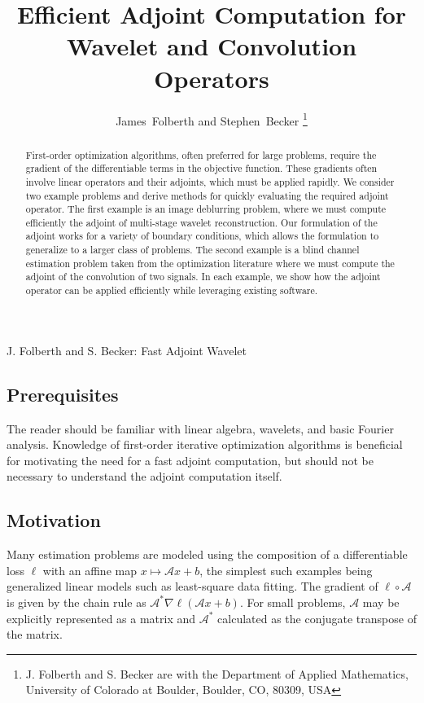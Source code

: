 \documentclass[journal]{IEEEtran}
\newcommand{\A}{\mathcal{A}}
\begin{document}
\title{Efficient Adjoint Computation for Wavelet and Convolution Operators}
\author{James~Folberth and 
        Stephen~Becker%
\thanks{J. Folberth and S. Becker are with the Department
of Applied Mathematics, University of Colorado at Boulder,
Boulder, CO, 80309, USA}}

%
{J. Folberth and S. Becker: Fast Adjoint Wavelet}

\maketitle

\begin{abstract}
   First-order optimization algorithms, often preferred for large problems, require the gradient of the differentiable terms in the objective function.  These gradients often involve linear operators and their adjoints, which must be applied rapidly.  We consider two example problems and derive methods for quickly evaluating the required adjoint operator.  The first example is an image deblurring problem, where we must compute efficiently the adjoint of multi-stage wavelet reconstruction.  Our formulation of the adjoint works for a variety of boundary conditions, which allows the formulation to generalize to a larger class of problems.  The second example is a blind channel estimation problem taken from the optimization literature where we must compute the adjoint of the convolution of two signals.  In each example, we show how the adjoint operator can be applied efficiently while leveraging existing software.
\end{abstract}

\subsection*{Prerequisites}
The reader should be familiar with linear algebra, wavelets, and basic Fourier analysis.  Knowledge of first-order iterative optimization algorithms is beneficial for motivating the need for a fast adjoint computation, but should not be necessary to understand the adjoint computation itself.

\subsection*{Motivation}
Many estimation problems are modeled using the composition of a differentiable loss $\ell$ with an affine map $x\mapsto\mathcal{A}x+b$, the simplest such examples being generalized linear models such as least-square data fitting. The gradient of $\ell \circ \A$ is given by the chain rule as $\mathcal{A}^* \nabla \ell( \A x + b)$. For small problems, $\A$ may be explicitly represented as a matrix and $\A^*$ calculated as the conjugate transpose of the matrix. 
\end{document}

